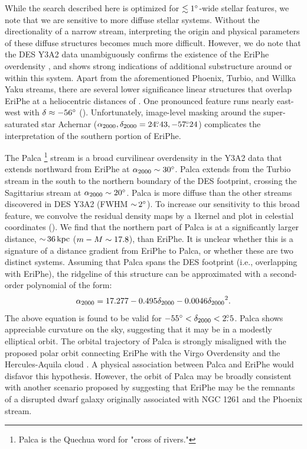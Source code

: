\documentclass[twocolumn]{aastex61}
\begin{document}
While the search described here is optimized for $\lesssim 1{}^{\circ}$-wide stellar features, we note that we are sensitive to more diffuse stellar systems.
Without the directionality of a narrow stream, interpreting the origin and physical parameters of these diffuse structures becomes much more difficult.
However, we do note that the DES Y3A2 data unambiguously confirms the existence of the EriPhe overdensity \citep{Li:2016}, and shows strong indications of additional substructure around or within this system.
Apart from the aforementioned Phoenix, Turbio, and Willka Yaku streams, there are several lower significance linear structures that overlap EriPhe at a heliocentric distances of .
One pronounced feature runs nearly east-west with $\delta \approx -56{}^{\circ}$ (). 
Unfortunately, image-level masking around the super-saturated star Achernar (${\alpha_{2000}},{\delta_{2000}} = 24\mbox{$.\!\!^\circ$}43,-57\mbox{$.\!\!^\circ$}24$) complicates the interpretation of the southern portion of EriPhe.

The Palca \footnote{Palca is the Quechua word for "cross of rivers."} stream is a broad curvilinear overdensity in the Y3A2 data that extends northward from EriPhe at ${\alpha_{2000}} \sim 30{}^{\circ}$.
Palca extends from the Turbio stream in the south to the northern boundary of the DES footprint, crossing the Sagittarius stream at ${\alpha_{2000}} \sim 20{}^{\circ}$.
Palca is more diffuse than the other streams discovered in DES Y3A2 (FWHM $ {\sim}\, 2{}^{\circ}$).
To increase our sensitivity to this broad feature, we convolve the residual density maps by a 1\degrees kernel and plot in celestial coordinates ().
We find that the northern part of Palca is at a significantly larger distance, $ {\sim}\, 36\mathrm{\,kpc}$ ($m - M \sim 17.8$), than EriPhe.
It is unclear whether this is a signature of a distance gradient from EriPhe to Palca, or whether these are two distinct systems.
Assuming that Palca spans the DES footprint (i.e., overlapping with EriPhe), the ridgeline of this structure can be approximated with a second-order polynomial of the form:
\begin{equation}
\ra = 17.277 - 0.495 \dec -0.0046 \dec^2.
\end{equation}
The above equation is found to be valid for $-55{}^{\circ} < {\delta_{2000}} < 2\mbox{$.\!\!^\circ$}5$.
Palca shows appreciable curvature on the sky, suggesting that it may be in a modestly elliptical orbit.
The orbital trajectory of Palca is strongly misaligned with the proposed polar orbit connecting EriPhe with the Virgo Overdensity and the Hercules-Aquila cloud \citep{Li:2016}. 
A physical association between Palca and EriPhe would disfavor this hypothesis.
However, the orbit of Palca may be broadly consistent with another scenario proposed by \citet{Li:2016} suggesting that EriPhe may be the remnants of a disrupted dwarf galaxy originally associated with NGC 1261 and the Phoenix stream.
\end{document}
